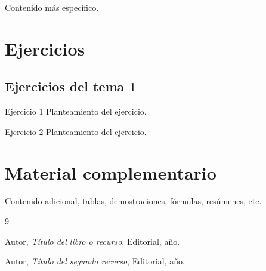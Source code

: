 \documentclass[12pt,oneside]{book}
\begin{document}
Contenido más específico.


\chapter{Ejercicios}

\section{Ejercicios del tema 1}

\begin{exercise}{Ejercicio 1}
Planteamiento del ejercicio.
\end{exercise}

\begin{exercise}{Ejercicio 2}
Planteamiento del ejercicio.
\end{exercise}


\appendix

\chapter{Material complementario}

Contenido adicional, tablas, demostraciones, fórmulas,
resúmenes, etc.


\begin{thebibliography}{9}

Autor,
\textit{Título del libro o recurso},
Editorial, año.

Autor,
\textit{Título del segundo recurso},
Editorial, año.

\end{thebibliography}
\end{document}
